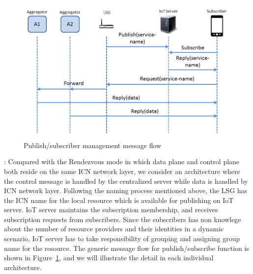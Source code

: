 \begin{figure}
\includegraphics[width=\columnwidth]{figure/pub_sub.png}
\caption{\label{fig:pubsub}Publish/subscriber management message flow}
\end{figure}
\vspace{1mm}: Compared with the Rendezvous mode in which data plane and control plane both reside on the same ICN network layer, we consider an architecture where the control message is handled by the centralized server while data is handled by ICN network layer.  Following the naming process mentioned above, the LSG has the ICN name for the local resource which is available for publishing on IoT server.  IoT server maintains the subscription membership, and receives subscription requests from subscribers. Since the subscribers has non knowlege about the number of resource providers and their identities  in a dynamic scenario,  IoT server has to take responsibility of grouping and assigning group name for the resource. The generic message flow for publish/subscribe function is shown in Figure~\ref{fig:pubsub}, and we will illustrate the detail in each individual architecture.
